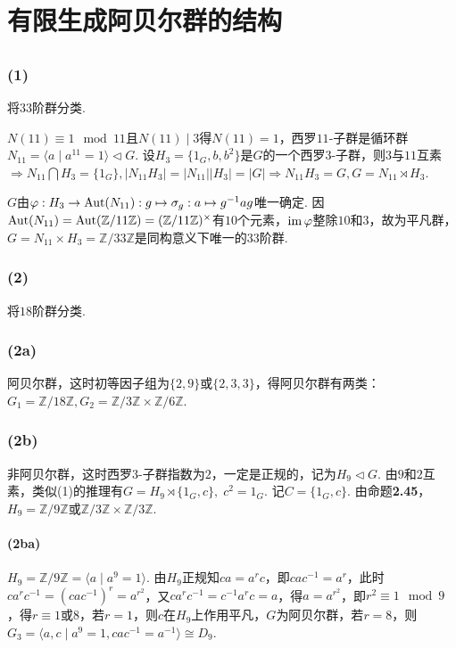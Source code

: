 \section{有限生成阿贝尔群的结构}
\subsection{}
\subsubsection{(1)}
将$33$阶群分类.

\jie
$N(11)\equiv 1\mod 11$且$N(11)\mid 3$得$N(11)=1$，西罗$11$-子群是循环群$N_{11}=\langle a\mid a^{11}=1\rangle\vartriangleleft G$.
设$H_3=\{1_G,b,b^2\}$是$G$的一个西罗$3$-子群，则$3$与$11$互素$\Rightarrow N_{11}\bigcap H_3=\{1_G\}, |N_{11}H_3|=|N_{11}||H_3|=|G|\Rightarrow N_{11}H_3=G, G=N_{11}\rtimes H_3$.

$G$由$\varphi: H_3\rightarrow \operatorname{Aut}(N_{11}): g\mapsto \sigma_g: a\mapsto g^{-1}ag$唯一确定.
因$\operatorname{Aut}(N_{11})=\operatorname{Aut}(\mathbb{Z}/11\mathbb{Z})=(\mathbb{Z}/11\mathbb{Z})^{\times}$有$10$个元素，$\operatorname{im}\varphi$整除$10$和$3$，故为平凡群，$G=N_{11}\times H_3=\mathbb{Z}/33\mathbb{Z}$是同构意义下唯一的$33$阶群.

\subsubsection{(2)}
将$18$阶群分类.

\jie
\subsubsection{(2a)}
阿贝尔群，这时初等因子组为$\{2,9\}$或$\{2,3,3\}$，得阿贝尔群有两类：
$G_1=\mathbb{Z}/18\mathbb{Z}, G_2=\mathbb{Z}/3\mathbb{Z}\times\mathbb{Z}/6\mathbb{Z}$.
\subsubsection{(2b)}
非阿贝尔群，这时西罗$3$-子群指数为$2$，一定是正规的，记为$H_9\vartriangleleft G$. 由$9$和$2$互素，类似(1)的推理有$G=H_9\rtimes \{1_G,c\},\;c^2=1_G$. 记$C=\{1_G,c\}$.
由{\heiti 命题}\textbf{2.45}，$H_9=\mathbb{Z}/9\mathbb{Z}$或$\mathbb{Z}/3\mathbb{Z}\times\mathbb{Z}/3\mathbb{Z}$.
\paragraph{(2ba)}
$H_9=\mathbb{Z}/9\mathbb{Z}=\langle a\mid a^9=1\rangle$. 
由$H_9$正规知$ca=a^rc$，即$cac^{-1}=a^r$，此时$ca^rc^{-1}=(cac^{-1})^r=a^{r^2}$，又$ca^rc^{-1}=c^{-1}a^rc=a$，得$a=a^{r^2}$，即$r^2\equiv 1\mod 9$，得$r\equiv 1$或$8$，若$r=1$，则$c$在$H_9$上作用平凡，$G$为阿贝尔群，若$r=8$，则$G_3=
\langle a,c\mid a^9=1, cac^{-1}=a^{-1}\rangle \cong D_9$.

